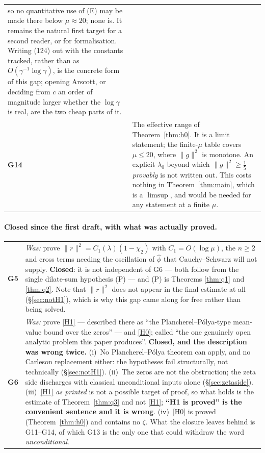 \documentclass[11pt,a4paper]{article}
\theoremstyle{plain}
\theoremstyle{definition}
\theoremstyle{remark}
\begin{document}
\begin{center}
\begin{tabular}{@{}lp{}@{}}
so no quantitative use of (E) may be made there below $\mu\approx20$; none is.
It remains the natural first target for a second reader, or for
formalisation.  Writing (124) out with the constants tracked, rather than as
$O(\gamma^{-1}\log\gamma)$, is the concrete form of this gap; opening Arscott,
or deciding from $c$ an order of magnitude larger whether the $\log\gamma$ is
real, are the two cheap parts of it. \\
\textbf{G14} & The effective range of Theorem~\ref{thm:h0}.  It is a limit
statement; the finite-$\mu$ table covers $\mu\le20$, where $\|g\|^2$ is
monotone.  An explicit $\lambda_0$ beyond which $\|g\|^2\ge\tfrac15$
\emph{provably} is not written out.  This costs nothing in
Theorem~\ref{thm:main}, which is a $\limsup$, and would be needed for any
statement at a finite $\mu$. \\
\hline
\end{tabular}
\end{center}

\paragraph{Closed since the first draft, with what was actually proved.}

\begin{center}\small
\begin{tabular}{@{}lp{}@{}}
\hline
\textbf{G5} & \emph{Was:} prove $\|r\|^2=C_1(\lambda)(1-\chi_2)$ with
$C_1=O(\log\mu)$, the $n\ge2$ and cross terms needing the oscillation of
$\widehat\phi$ that Cauchy--Schwarz will not supply.  \textbf{Closed}: it is not
independent of G6 --- both follow from the single dilate-sum hypothesis (P) ---
and (P) is Theorems \ref{thm:q1} and \ref{thm:q2}.  Note that $\|r\|^2$ does not
appear in the final estimate at all (\S\ref{sec:notH1}), which is why this gap
came along for free rather than being solved. \\
\textbf{G6} & \emph{Was:} prove \eqref{H1} --- described there as ``the
Plancherel--P\'olya-type mean-value bound over the zeros'' --- and \eqref{H0};
called ``the one genuinely open analytic problem this paper produces''.
\textbf{Closed, and the description was wrong twice.}  (i)~No
Plancherel--P\'olya theorem can apply, and no Carleson replacement either: the
hypotheses fail structurally, not technically (\S\ref{sec:notH1}).  (ii)~The
zeros are not the obstruction; the zeta side discharges with classical
unconditional inputs alone (\S\ref{sec:zetaside}).  (iii)~\eqref{H1} \emph{as
printed} is not a possible target of proof, so what holds is the estimate of
Theorem~\ref{thm:q3} and not \eqref{H1}; \textbf{``H1 is proved'' is the
convenient sentence and it is wrong}.  (iv)~\eqref{H0} is proved
(Theorem~\ref{thm:h0}) and contains no $\zeta$.  What the closure leaves behind
is G11--G14, of which G13 is the only one that could withdraw the word
\emph{unconditional}. \\
\hline
\end{tabular}
\end{center}
\end{document}
